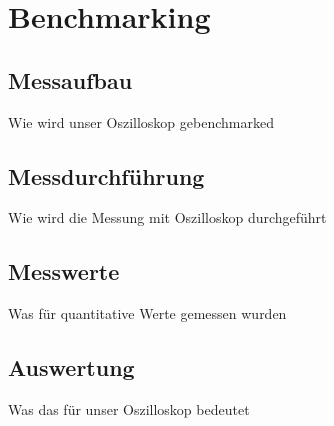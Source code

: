 \section{Benchmarking}

\subsection{Messaufbau}
Wie wird unser Oszilloskop gebenchmarked

\subsection{Messdurchführung}

Wie wird die Messung mit Oszilloskop durchgeführt

\subsection{Messwerte}

Was für quantitative Werte gemessen wurden

\subsection{Auswertung}

Was das für unser Oszilloskop bedeutet



